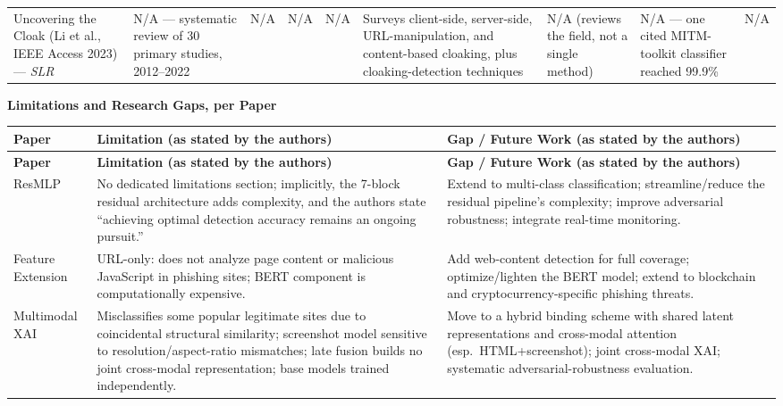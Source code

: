 \documentclass[10pt]{article}
\begin{document}
\begin{longtable}{L{2.6cm} L{2.6cm} L{1.8cm} L{2.7cm} L{2.7cm} L{4.4cm} L{3.4cm} L{2.6cm} L{3.0cm}}
Uncovering the Cloak (Li et al., IEEE Access 2023) --- \textit{SLR}
 & N/A --- systematic review of 30 primary studies, 2012--2022
 & N/A
 & N/A
 & N/A
 & Surveys client-side, server-side, URL-manipulation, and content-based cloaking, plus cloaking-detection techniques
 & N/A (reviews the field, not a single method)
 & N/A --- one cited MITM-toolkit classifier reached 99.9\%
 & N/A \\

\end{longtable}

\newpage
\begin{center}
{\Large \textbf{Limitations and Research Gaps, per Paper}}
\end{center}
\vspace{6pt}

\footnotesize
\begin{longtable}{L{4cm} L{10.5cm} L{10.5cm}}
\toprule
\textbf{Paper} & \textbf{Limitation (as stated by the authors)} & \textbf{Gap / Future Work (as stated by the authors)} \\
\midrule
\endfirsthead
\toprule
\textbf{Paper} & \textbf{Limitation (as stated by the authors)} & \textbf{Gap / Future Work (as stated by the authors)} \\
\midrule
\endhead
\bottomrule
\endfoot
\bottomrule
\endlastfoot

ResMLP
 & No dedicated limitations section; implicitly, the 7-block residual architecture adds complexity, and the authors state ``achieving optimal detection accuracy remains an ongoing pursuit.''
 & Extend to multi-class classification; streamline/reduce the residual pipeline's complexity; improve adversarial robustness; integrate real-time monitoring. \\

Feature Extension
 & URL-only: does not analyze page content or malicious JavaScript in phishing sites; BERT component is computationally expensive.
 & Add web-content detection for full coverage; optimize/lighten the BERT model; extend to blockchain and cryptocurrency-specific phishing threats. \\

Multimodal XAI
 & Misclassifies some popular legitimate sites due to coincidental structural similarity; screenshot model sensitive to resolution/aspect-ratio mismatches; late fusion builds no joint cross-modal representation; base models trained independently.
 & Move to a hybrid binding scheme with shared latent representations and cross-modal attention (esp.\ HTML+screenshot); joint cross-modal XAI; systematic adversarial-robustness evaluation. \\


\end{longtable}
\end{document}
